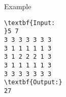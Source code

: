 Example
\begin{verbatim}
\textbf{Input:
}5 7
3 3 3 3 3 3 3
3 1 1 1 1 1 3
3 1 2 2 2 1 3
3 1 1 1 1 1 3
3 3 3 3 3 3 3
\textbf{Output:}
27
\end{verbatim}
